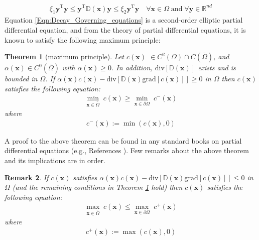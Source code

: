 \documentclass[11pt]{amsart}
\newtheorem{theorem}{Theorem}[section]
\newtheorem{remark}[theorem]{Remark}
\begin{document}
\begin{align}
\label{Eqn:Decay_positive_definiteness_D}
  \xi_1 \mathbf{y}^{\mathrm{T}} \mathbf{y}\leq \mathbf{y}^{\mathrm{T}} \mathbb{D}
  (\mathbf{x}) \mathbf{y} \leq \xi_2 \mathbf{y}^{\mathrm{T}} \mathbf{y} \quad 
  \forall \mathbf{x} \in \Omega \; \mathrm{and} \; \forall \mathbf{y} \in 
  \mathbb{R}^{nd}
\end{align}
Equation \eqref{Eqn:Decay_Governing_equations} is a second-order elliptic partial differential 
equation, and from the theory of partial differential equations, it is known to satisfy the 
following maximum principle: 
\begin{theorem}[maximum principle]
  \label{Theorem:Decay_maximum_principle}
  Let $c(\mathbf{x})$ $\in C^{2}(\Omega) \cap C(\bar{\Omega})$, and $\alpha(\mathbf{x}) \in 
  C^{0}(\bar{\Omega})$ with $\alpha(\mathbf{x}) \geq 0$. In addition, $\mathrm{div}[\mathbb{D}
  (\mathbf{x})]$ exists and is bounded in $\Omega$. If $\alpha(\mathbf{x}) c(\mathbf{x}) - 
  \mathrm{div}[\mathbb{D}(\mathbf{x}) \mathrm{grad}[c(\mathbf{x})]] \geq 0$ in $\Omega$ 
  then $c(\mathbf{x})$ satisfies the following equation: 
\begin{align}
    \label{Eqn:Decay_Maximum_principle}
    \mathop{\mathrm{min}}_{\mathbf{x} \in \bar{\Omega}} \; c(\mathbf{x}) \geq 
    \mathop{\mathrm{min}}_{\mathbf{x} \in \partial \Omega} \; c^{-}(\mathbf{x})
  \end{align}
where 
  \begin{align}
    c^{-}(\mathbf{x}) := \min(c(\mathbf{x}),0)
  \end{align}
\end{theorem}
\noindent A proof to the above theorem can be found in any standard books on partial differential 
equations (e.g., References \cite{Fraenkel_maximum_principles,Gilbarg_Trudinger,Protter_Weinberger}). 
Few remarks about the above theorem and its implications are in order.
\begin{remark}
\label{Remark:Decay_max_min}
  If $c(\mathbf{x})$ satisfies $\alpha(\mathbf{x}) c(\mathbf{x}) - \mathrm{div}[\mathbb{D}
  (\mathbf{x})\mathrm{grad}[c(\mathbf{x})]] \leq 0$ in $\Omega$ (and the remaining conditions 
  in Theorem \ref{Theorem:Decay_maximum_principle} hold) then $c(\mathbf{x})$ satisfies the 
  following equation: 
\begin{align}
    \mathop{\mathrm{max}}_{\mathbf{x} \in \bar{\Omega}} \; c(\mathbf{x}) 
    \leq \mathop{\mathrm{max}}_{\mathbf{x} \in \partial \Omega} \; c^{+}(\mathbf{x})
  \end{align}
where 
  \begin{align}
    c^{+}(\mathbf{x}) := \max(c(\mathbf{x}),0)
  \end{align}
\end{remark}
\end{document}
